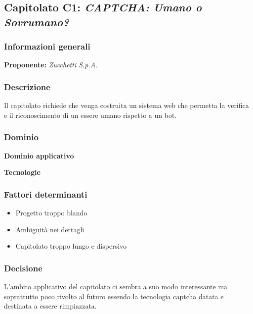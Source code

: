 \subsection{Capitolato C1: \textit{CAPTCHA: Umano o Sovrumano?}}

\subsubsection{Informazioni generali}

\textbf{Proponente:} \textit{Zucchetti S.p.A.}

\subsubsection{Descrizione}
Il capitolato richiede che venga costruita un sistema web che permetta la verifica e il riconoscimento di un essere umano rispetto a un bot. %

\subsubsection{Dominio}

\textbf{Dominio applicativo}


\textbf{Tecnologie}


\subsubsection{Fattori determinanti}
\begin{itemize}
    \item Progetto troppo blando
    \item Ambiguità nei dettagli
    \item Capitolato troppo lungo e dispersivo
\end{itemize}

\subsubsection{Decisione}
L'ambito applicativo del capitolato ci sembra a suo modo interessante ma soprattutto poco rivolto al futuro essendo la tecnologia captcha datata e destinata a essere rimpiazzata. 
